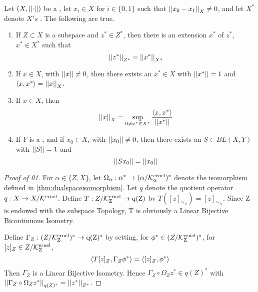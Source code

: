 \label{thm:hahnbanach}
\begin{thm}
Let $(X,\left|\left| \cdot \right|\right|)$ be a \SeminormedSpace,
let $x_i \in X$ for $i \in \{0,1\}$ such that 
$\left|\left| x_0-x_1 \right|\right|_X \neq 0$, and
let $X^*$ denote $X's$
\TopDualSpace. 
The following are true. 
\begin{enumerate}
    \item If $Z \subset X$ is a subspace
        and $z^* \in Z^*$, then there 
        is an extension $x^*$ of $z^*$, 
        $x^* \in X^*$ such that 
        \begin{equation}
        \left|\left| z^* \right|\right|_{Z^*} = \left|\left| x^* \right|\right|_{X^*}
        \end{equation}
     \item If $x \in X$, 
        with $\left|\left| x \right|\right| \neq 0$, 
        then there exists an
        $x^* \in X$ with 
        $\left|\left| x^* \right|\right|=1$ and 
        $\left\langle x,x^* \right\rangle = \left|\left| x \right|\right|_X$. 
    \item If $x \in X$, then 
    \begin{equation}
        \left|\left| x \right|\right|_X = \sup\limits_{0 \neq x^* \in X^*} \frac{\left\langle x,x^* \right\rangle}{\left|\left| x^* \right|\right|}
    \end{equation}
    \item If $Y$ is a 
        \NonDegenerate
        \SeminormedSpace, and if 
        $x_0 \in X$, with 
        $\left|\left| x_0 \right|\right| \neq 0$, 
        then there exists
        an $S \in BL(X,Y)$ with 
        $\left|\left| S \right|\right| = 1$ and 
        \begin{equation}
            \left|\left| Sx_0 \right|\right| = \left|\left| x_0 \right|\right|
        \end{equation}
\end{enumerate}


\begin{proof}[Proof of 01]
    For $\alpha \in \{Z,X\}$, let 
    $\Omega_\alpha:\alpha^* \to (\alpha/\bf\mathcal{K}\rm^{ernel}_\alpha)^*$ denote the isomorphism
    defined in 
    \ref{thm:dualspaceisomorphism}.
    Let $q$ denote the quotient operator $q:X \to X/\bf\mathcal{K}\rm^{ernel}$. 
    Define $T:Z/\bf\mathcal{K}\rm^{ernel}_Z \to q(Z)$ bv $T([z]_{\cong_Z} ) = [z]_{\cong_X}$. %
    Since Z is endowed with the subspace Topology,                       %
    T is obviously a Linear Bijective Bicontinuous Isometry.          %
    
    Define $\Gamma_Z:(Z/\bf\mathcal{K}\rm^{ernel}_Z)^* \to q(Z)^*$ by setting, 
    for $\phi^* \in (Z/\bf\mathcal{K}\rm^{ernel}_Z)^*$, 
    for $[z]_Z \in Z/\bf\mathcal{K}\rm^{ernel}_Z$, 
    \begin{equation}
        \left\langle T[z]_Z, \Gamma_Z \phi^* \right\rangle = \left\langle [z]_Z, \phi^* \right\rangle
    \end{equation}
    Then $\Gamma_Z$ is a Linear Bijective Isometry. 
    Hence $\Gamma_Z \circ \Omega_Z z^* \in q(Z)^*$ with 
    $\left|\left| \Gamma_Z \circ \Omega_Z z^* \right|\right|_{q(Z)^*} = \left|\left| z^* \right|\right|_{Z^*}$. 


\end{proof}
\end{thm}
